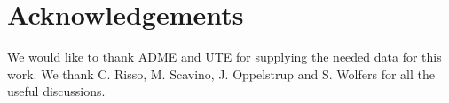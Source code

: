 \documentclass[ima, 20pt, portrait, plainboxedsections]{sciposter}
\begin{document}
\begin{multicols}{3}
\begin{itemize}
\end{itemize}  
  
\section*{Acknowledgements}

We would like to thank ADME \cite{ADME} and UTE \cite{UTE} for supplying the needed data for this work. We thank C. Risso, M. Scavino, J. Oppelstrup and S. Wolfers for all the useful discussions.




\end{multicols}
\end{document}
